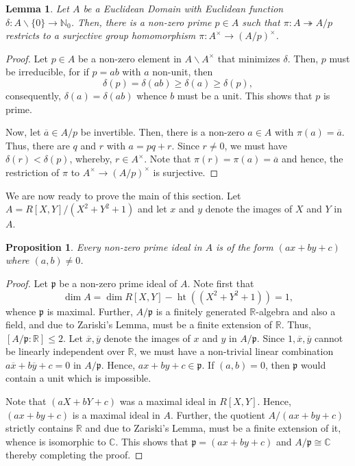 \documentclass[12pt]{article}
\theoremstyle{thmstyle}
\newtheorem{lemma}[theorem]{Lemma}
\newtheorem{proposition}[theorem]{Proposition}
\theoremstyle{defstyle}
\newcommand{\R}{\mathbb{R}}
\newcommand{\N}{\mathbb{N}}
\newcommand{\bbC}{\mathbb{C}}
\newcommand{\frakp}{\mathfrak{p}} %
\renewcommand{\le}{\leqslant}
\renewcommand{\ge}{\geqslant}
\begin{document}
\begin{lemma}
    Let $A$ be a Euclidean Domain with Euclidean function $\delta: A\backslash\{0\}\to\N_0$. Then, there is a non-zero prime $p\in A$ such that $\pi: A\twoheadrightarrow A/p$ restricts to a surjective group homomorphism $\pi: A^\times\to (A/p)^\times$.
\end{lemma}
\begin{proof}
    Let $p\in A$ be a non-zero element in $A\backslash A^\times$ that minimizes $\delta$. Then, $p$ must be irreducible, for if $p = ab$ with $a$ non-unit, then 
    \begin{equation*}
        \delta(p) = \delta(ab)\ge\delta(a)\ge\delta(p),
    \end{equation*}
    consequently, $\delta(a) = \delta(ab)$ whence $b$ must be a unit. This shows that $p$ is prime. 

    Now, let $\overline a\in A/p$ be invertible. Then, there is a non-zero $a\in A$ with $\pi(a) = \overline a$. Thus, there are $q$ and $r$ with $a = pq + r$. Since $r\ne 0$, we must have $\delta(r) < \delta(p)$, whereby, $r\in A^\times$. Note that $\pi(r) = \pi(a) = \overline a$ and hence, the restriction of $\pi$ to $A^\times\to (A/p)^\times$ is surjective.
\end{proof}

We are now ready to prove the main of this section. Let $A = R[X, Y]/(X^2 + Y^2 + 1)$ and let $x$ and $y$ denote the images of $X$ and $Y$ in $A$.

\begin{proposition}
    Every non-zero prime ideal in $A$ is of the form $(ax + by + c)$ where $(a,b)\ne 0$.
\end{proposition}
\begin{proof}
    Let $\frakp$ be a non-zero prime ideal of $A$. Note first that 
    \begin{equation*}
        \dim A = \dim R[X, Y] - \operatorname{ht}((X^2 + Y^2 + 1)) = 1,
    \end{equation*}
    whence $\frakp$ is maximal. Further, $A/\frakp$ is a finitely generated $\R$-algebra and also a field, and due to Zariski's Lemma, must be a finite extension of $\R$. Thus, $[A/\frakp : \R]\le 2$. Let $\overline x, \overline y$ denote the images of $x$ and $y$ in $A/\frakp$. Since $1,\overline x,\overline y$ cannot be linearly independent over $\R$, we must have a non-trivial linear combination $a\overline x + b\overline y + c = 0$ in $A/\frakp$. Hence, $ax + by + c\in\frakp$. If $(a,b) = 0$, then $\frakp$ would contain a unit which is impossible.

    Note that $(aX + bY + c)$ was a maximal ideal in $R[X, Y]$. Hence, $(ax + by + c)$ is a maximal ideal in $A$. Further, the quotient $A/(ax + by + c)$ strictly contains $\R$ and due to Zariski's Lemma, must be a finite extension of it, whence is isomorphic to $\bbC$. This shows that $\frakp = (ax + by + c)$ and $A/\frakp\cong\bbC$ thereby completing the proof.
\end{proof}
\end{document}
